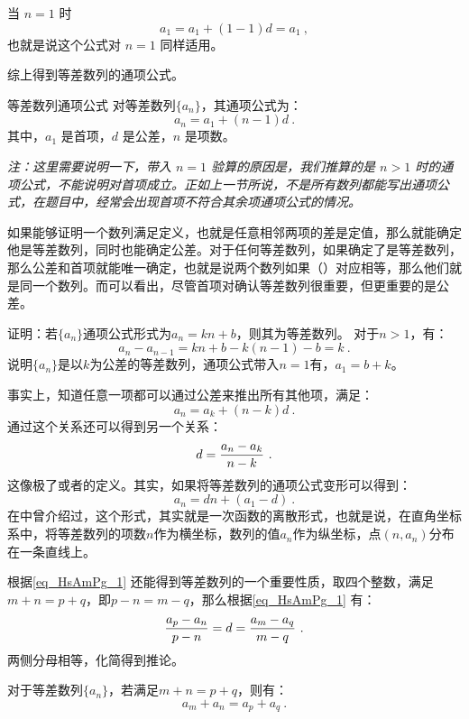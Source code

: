 当 $n = 1$ 时
\begin{equation}
a_1 = a_1 + (1 - 1)d = a_1~,
\end{equation}
也就是说这个公式对 $n = 1$ 同样适用。

综上得到等差数列的通项公式。

\begin{corollary}{等差数列通项公式}
对等差数列$\{a_n\}$，其通项公式为：
\begin{equation}\label{eq_HsAmPg_5}
a_n = a_1 + (n - 1)d~.
\end{equation}
其中，$a_1$ 是首项，$d$ 是公差，$n$ 是项数。
\end{corollary}

\textsl{注：这里需要说明一下，带入 $n = 1$ 验算的原因是，我们推算的是 $n > 1$ 时的通项公式，不能说明对首项成立。正如上一节所说，不是所有数列都能写出通项公式，在题目中，经常会出现首项不符合其余项通项公式的情况。}


如果能够证明一个数列满足定义，也就是任意相邻两项的差是定值，那么就能确定他是等差数列，同时也能确定公差。对于任何等差数列，如果确定了是等差数列，那么公差和首项就能唯一确定，也就是说两个数列如果（）对应相等，那么他们就是同一个数列。而可以看出，尽管首项对确认等差数列很重要，但更重要的是公差。
\begin{example}{证明：若$\{a_n\}$通项公式形式为$a_n=kn+b$，则其为等差数列。}
对于$n>1$，有：
\begin{equation}
a_n-a_{n-1}=kn+b-k(n-1)-b=k~.
\end{equation}
说明$\{a_n\}$是以$k$为公差的等差数列，通项公式带入$n=1$有，$a_1=b+k$。
\end{example}

事实上，知道任意一项都可以通过公差来推出所有其他项，满足：
\begin{equation}
a_n=a_k+(n-k)d~.
\end{equation}
通过这个关系还可以得到另一个关系：
\begin{equation}\label{eq_HsAmPg_1}
d={a_n-a_k\over n-k}~.
\end{equation}
这像极了或者的定义。其实，如果将等差数列的通项公式变形可以得到：
\begin{equation}
a_n=dn+(a_1-d)~.
\end{equation}
在中曾介绍过，这个形式，其实就是一次函数的离散形式，也就是说，在直角坐标系中，将等差数列的项数$n$作为横坐标，数列的值$a_n$作为纵坐标，点$(n,a_n)$分布在一条直线上。


根据\autoref{eq_HsAmPg_1} 还能得到等差数列的一个重要性质，取四个整数，满足$m+n=p+q$，即$p-n=m-q$，那么根据\autoref{eq_HsAmPg_1} 有：
\begin{equation}
{a_p-a_n\over p-n}=d={a_m-a_q\over m-q}~.
\end{equation}
两侧分母相等，化简得到推论。
\begin{corollary}{}\label{cor_HsAmPg_1}
对于等差数列$\{a_n\}$，若满足$m+n=p+q$，则有：
\begin{equation}
a_m+a_n=a_p+a_q~.
\end{equation}
\end{corollary}


